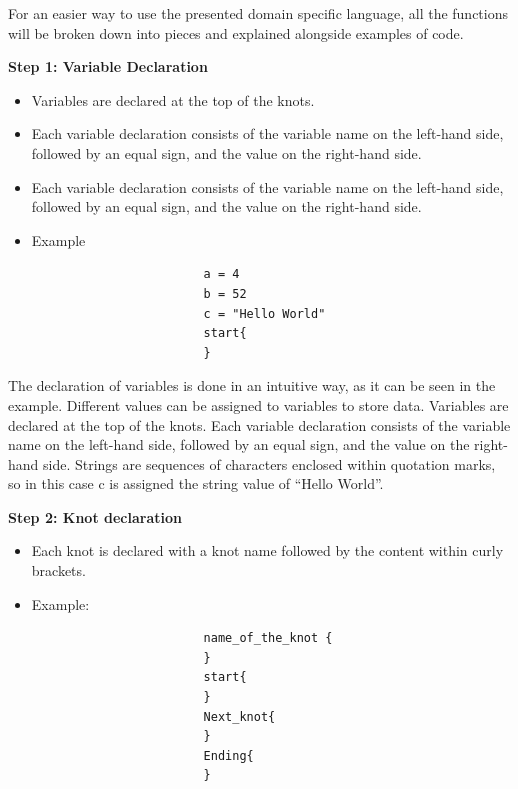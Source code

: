  \noindent For an easier way to use the presented domain specific language, all the functions will be broken down into pieces and explained alongside examples of code. 

 \noindent \textbf{Step 1: Variable Declaration}
 \begin{itemize}
                \item 	Variables are declared at the top of the knots.
                \item Each variable declaration consists of the variable name on the left-hand side, followed by an equal sign, and the value on the right-hand side.
                \item Each variable declaration consists of the variable name on the left-hand side, followed by an equal sign, and the value on the right-hand side.
                \item Example 
                        \begin{verbatim}
                        a = 4
                        b = 52
                        c = "Hello World"
                        start{
                        }

                        \end{verbatim}
                
 \end{itemize}

\noindent The declaration of variables is done in an intuitive way, as it can be seen in the example. Different values can be assigned to variables to store data. Variables are declared at the top of the knots. Each variable declaration consists of the variable name on the left-hand side, followed by an equal sign, and the value on the right-hand side. Strings are sequences of characters enclosed within quotation marks, so in this case c is assigned the string value of “Hello World”. 

  \noindent \textbf{Step 2: Knot declaration}
 \begin{itemize}
                \item Each knot is declared with a knot name followed by the content within curly brackets.
                \item Example: \begin{verbatim}
                        name_of_the_knot {
                        }
                        start{
                        }
                        Next_knot{
                        }
                        Ending{
                        }
                
                      \end{verbatim}
 \end{itemize}

